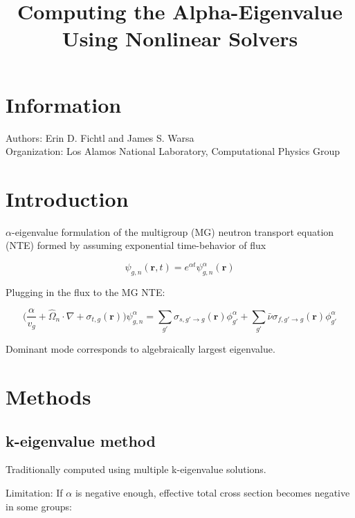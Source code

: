 \documentclass{article}
\title{Computing the Alpha-Eigenvalue Using Nonlinear Solvers}
\date{\vspace{-5ex}}
\begin{document}
\maketitle

\section*{Information}

Authors: Erin D. Fichtl and James S. Warsa \\

Organization: Los Alamos National Laboratory, Computational Physics Group

\section*{Introduction}

$\alpha$-eigenvalue formulation of the multigroup (MG) neutron transport equation (NTE) formed by assuming exponential time-behavior of flux

\begin{equation*}
\psi_{g,n}(\mathbf{r},t) = e^{\alpha t} \psi^{\alpha}_{g,n}(\mathbf{r})
\end{equation*}

Plugging in the flux to the MG NTE:

\begin{equation*}  
\bigg ( \frac{\alpha}{v_g} + \hat{\Omega}_n \cdot \nabla + \sigma_{t,g}(\mathbf{r}) \bigg ) \psi^{\alpha}_{g,n} = \sum_{g'} \sigma_{s,g'\rightarrow g}(\mathbf{r})\phi^{\alpha}_{g'} + \sum_{g'} \bar{\nu} \sigma_{f,g' \rightarrow g}(\mathbf{r})\phi^{\alpha}_{g'}
\end{equation*}

Dominant mode corresponds to algebraically largest eigenvalue.

\section*{Methods}

\subsection*{k-eigenvalue method}

Traditionally computed using multiple k-eigenvalue solutions.

Limitation: If $\alpha$ is negative enough, effective total cross section becomes negative in some groups: 
\end{document}
